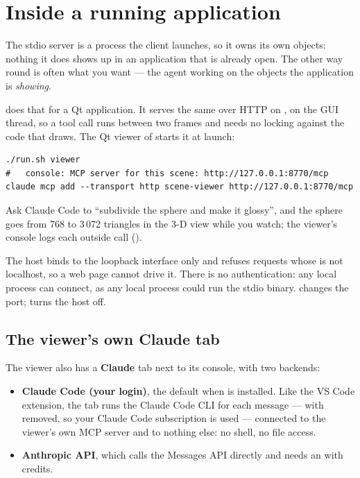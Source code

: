 \section{Inside a running application}

The stdio server is a process the client launches, so it owns its own objects:
nothing it does shows up in an application that is already open. The other way
round is often what you want --- the agent working on the objects the
application is \emph{showing}.

 does that for a Qt application. It
serves the same  over HTTP on , on the GUI thread,
so a tool call runs between two frames and needs no locking against the code
that draws. The Qt viewer of  starts it at launch:

\begin{lstlisting}[style=sh]
./run.sh viewer
#   console: MCP server for this scene: http://127.0.0.1:8770/mcp
claude mcp add --transport http scene-viewer http://127.0.0.1:8770/mcp
\end{lstlisting}

Ask Claude Code to ``subdivide the sphere and make it glossy'', and the sphere
goes from 768 to 3\,072 triangles in the 3-D view while you watch; the viewer's
console logs each outside call ().

\begin{note}
The host binds to the loopback interface only and refuses requests whose
 is not localhost, so a web page cannot drive it. There is no
authentication: any local process can connect, as any local process could run
the stdio binary.  changes the port;  turns the
host off.
\end{note}

\subsection*{The viewer's own Claude tab}

The viewer also has a \textbf{Claude} tab next to its console, with two
backends:

\begin{itemize}
  \item \textbf{Claude Code (your login)}, the default when  is
    installed. Like the VS Code extension, the tab runs the Claude Code CLI for
    each message --- with  removed, so your Claude Code
    subscription is used --- connected to the viewer's own MCP server and to
    nothing else: no shell, no file access.
  \item \textbf{Anthropic API}, which calls the Messages API directly and needs
    an  with credits.
\end{itemize}

